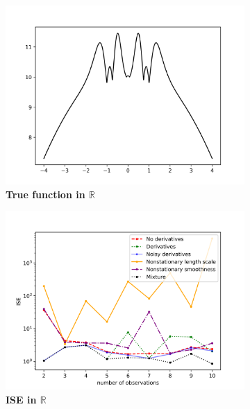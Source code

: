 \documentclass{article}
\newcommand{\R}{\mathbb{R}}
\numberwithin{equation}{section}
\begin{document}
\begin{figure}
		\centering
		\captionsetup{justification=centering}
    \begin{subfigure}[t]{.4\textwidth}
      \centering
      \includegraphics[scale=0.35]{figures/crazy.png}
      \caption{\textbf{True function in $\R$}}
    \end{subfigure}%
    \begin{subfigure}[t]{.4\textwidth}
      \centering
      \includegraphics[scale=0.35]{figures/crazy-1D.png}
      \caption{\textbf{ISE in $\R$}}
    \end{subfigure}
    \begin{subfigure}[t]{.4\textwidth}
      \centering

\end{subfigure}
\end{figure}
\end{document}
